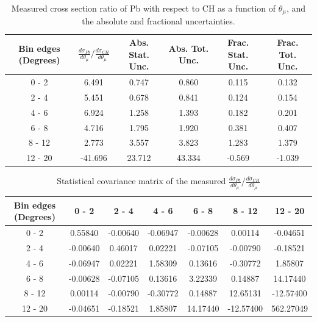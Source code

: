 \documentclass[aps,prl,twocolumn,superscriptaddress,nofootinbib]{revtex4-1}
\begin{document}
\begin{table}[h!]
  \centering
  \caption{Measured cross section ratio of Pb with respect to CH as a function
  of $\theta_{\mu}$,  and the absolute and fractional uncertainties.}
    \begin{tabular}{c||c||c|c||c|c}
      Bin edges (Degrees) & $\frac{d\sigma_{Pb}}{d\theta_{\mu}}/\frac{d\sigma_{CH}}{d\theta_{\mu}}$ & Abs. Stat. Unc. & Abs. Tot. Unc. & Frac. Stat. Unc. & Frac. Tot. Unc. \\
      \hline\hline
        0 - 2 & 6.491 & 0.747 & 0.860 & 0.115 & 0.132 \\
        2 - 4 & 5.451 & 0.678 & 0.841 & 0.124 & 0.154 \\
        4 - 6 & 6.924 & 1.258 & 1.393 & 0.182 & 0.201 \\
        6 - 8 & 4.716 & 1.795 & 1.920 & 0.381 & 0.407 \\
       8 - 12 & 2.773 & 3.557 & 3.823 & 1.283 & 1.379 \\
      12 - 20 & -41.696 & 23.712 & 43.334 & -0.569 & -1.039 \\
    \end{tabular}
  \label{table:ThetaMuXSecRatio_Pb}
\end{table}

\begin{table}[h!]
  \centering
  \caption{Statistical covariance matrix of the measured $\frac{d\sigma_{Pb}}{d\theta_{\mu}}/\frac{d\sigma_{CH}}{d\theta_{\mu}}$}
    \begin{tabular}{c||cccccc}
      Bin edges (Degrees) & 0 - 2 & 2 - 4 & 4 - 6 & 6 - 8 & 8 - 12 & 12 - 20 \\
\hline \hline
        0 - 2 &  0.55840 & -0.00640 & -0.06947 & -0.00628 &  0.00114 & -0.04651 \\
        2 - 4 & -0.00640 &  0.46017 &  0.02221 & -0.07105 & -0.00790 & -0.18521 \\
        4 - 6 & -0.06947 &  0.02221 &  1.58309 &  0.13616 & -0.30772 &  1.85807 \\
        6 - 8 & -0.00628 & -0.07105 &  0.13616 &  3.22339 &  0.14887 & 14.17440 \\
       8 - 12 &  0.00114 & -0.00790 & -0.30772 &  0.14887 & 12.65131 & -12.57400 \\
      12 - 20 & -0.04651 & -0.18521 &  1.85807 & 14.17440 & -12.57400 & 562.27049 \\
    \end{tabular}
  \label{tablecov:Pb_Statistical_ThetaMu}
\end{table}
\end{document}
